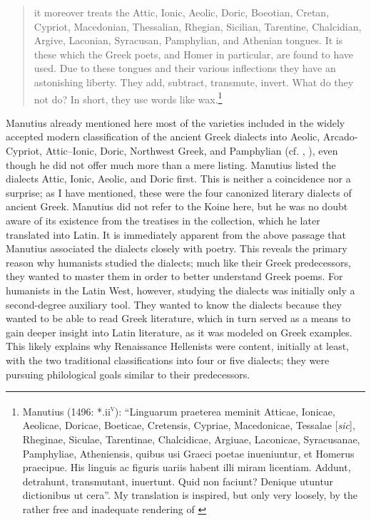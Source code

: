 {\begin{quote}
it moreover treats the Attic, Ionic, Aeolic, Doric, Boeotian, Cretan, Cypriot, Macedonian, Thessalian, Rhegian, Sicilian, Tarentine, Chalcidian, Argive, Laconian, Syracusan, Pamphylian, and Athenian tongues. It is these which the Greek poets, and Homer in particular, are found to have used. Due to these tongues and their various inflections they have an astonishing liberty. They add, subtract, transmute, invert. What do they not do? In short, they use words like wax.\footnote{Manutius (1496: *.ii\textsc{\textsuperscript{v}}): “Linguarum praeterea meminit Atticae, Ionicae, Aeolicae, Doricae, Boeticae, Cretensis, Cypriae, Macedonicae, Tessalae [\textit{sic}], Rheginae, Siculae, Tarentinae, Chalcidicae, Argiuae, Laconicae, Syracusanae, Pamphyliae, Atheniensis, quibus usi Graeci poetae inueniuntur, et Homerus praecipue. His linguis ac figuris uariis habent illi miram licentiam. Addunt, detrahunt, transmutant, inuertunt. Quid non faciunt? Denique utuntur dictionibus ut cera”. My translation is inspired, but only very loosely, by the rather free and inadequate rendering of \citet[12]{Bean1958}} 
\end{quote}

Manutius already mentioned here most of the varieties included in the widely accepted modern classification of the ancient Greek dialects into Aeolic, Arcado-Cypriot, Attic–Ionic, Doric, Northwest Greek, and Pamphylian (cf. , ), even though he did not offer much more than a mere listing. Manutius listed the dialects Attic, Ionic, Aeolic, and Doric first. This is neither a coincidence nor a surprise; as I have mentioned, these were the four canonized literary dialects of ancient Greek. Manutius did not refer to the Koine here, but he was no doubt aware of its existence from the treatises in the collection, which he later translated into Latin. It is immediately apparent from the above passage that Manutius associated the dialects closely with poetry. This reveals the primary reason why humanists studied the dialects; much like their Greek predecessors, they wanted to master them in order to better understand Greek poems. For humanists in the Latin West, however, studying the dialects was initially only a second-degree auxiliary tool. They wanted to know the dialects because they wanted to be able to read Greek literature, which in turn served as a means to gain deeper insight into Latin literature, as it was modeled on Greek examples. This likely explains why Renaissance Hellenists were content, initially at least, with the two traditional classifications into four or five dialects; they were pursuing philological goals similar to their predecessors.

}
